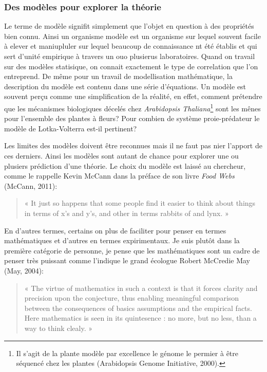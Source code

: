 \subsubsection*{Des modèles pour explorer la
théorie}\label{des-moduxe8les-pour-explorer-la-thuxe9orie}

Le terme de modèle signifit simplement que l'objet en question à des
propriétés bien connu. Ainsi un organisme modèle est un organisme sur
lequel souvent facile à elever et maniupluler sur lequel beaucoup de
connaissance nt été établis et qui sert d'unité empirique à travers un
ouo plusierus laboratoires. Quand on travail sur des modèles statisique,
on connait exactement le type de correlation que l'on entreprend. De
même pour un travail de modellisation mathématique, la description du
modèle est contenu dans une série d'équations. Un modèle est souvent
perçu comme une simplification de la réalité, en effet, comment
prétendre que les mécanismes biologiques décelés chez \emph{Arabidopsis
Thaliana}\footnote{Il s'agit de la plante modèle par excellence le
  génome le permier à être séquencé chez les plantes (Arabidopsis Genome
  Initiative, 2000).} sont les mênes pour l'ensemble des plantes à
fleurs? Pour combien de système proie-prédateur le modèle de
Lotka-Volterra est-il pertinent?

Les limites des modèles doivent être reconnues mais il ne faut pas nier
l'apport de ces derniers. Ainsi les modèles sont autant de chance pour
explorer une ou plusiers prédiction d'une théorie. Le choix du modèle
est laissé au chercheur, comme le rappelle Kevin McCann dans la préface
de son livre \emph{Food Webs} (McCann, 2011):

\begin{quote}
« It just so happens that some people find it easier to think about
things in terms of x's and y's, and other in terms rabbits of and lynx.
»
\end{quote}

En d'autres termes, certains on plus de faciliter pour penser en termes
mathématiques et d'autres en termes expirimentaux. Je suis plutôt dans
la première catégorie de personne, je pense que les mathématiques sont
un cadre de penser très puissant comme l'indique le grand écologue
Robert McCredie May (May, 2004):

\begin{quote}
« The virtue of mathematics in such a context is that it forces clarity
and precision upon the conjecture, thus enabling meaningful comparison
between the consequences of basics assumptions and the empirical facts.
Here mathematics is seen in its quintesence : no more, but no less, than
a way to think clealy. »
\end{quote}

